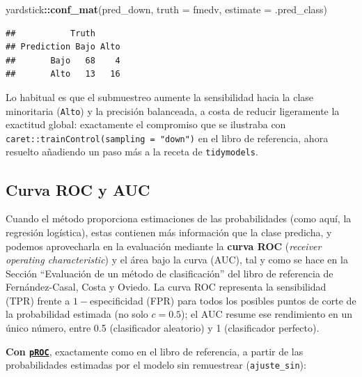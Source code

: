 \documentclass[
]{book}
\newenvironment{Shaded}{\begin{snugshade}}{\end{snugshade}}
\newcommand{\AttributeTok}[1]{\textcolor[rgb]{0.13,0.29,0.53}{#1}}
\newcommand{\FunctionTok}[1]{\textcolor[rgb]{0.13,0.29,0.53}{\textbf{#1}}}
\newcommand{\NormalTok}[1]{#1}
\newcommand{\OtherTok}[1]{\textcolor[rgb]{0.56,0.35,0.01}{#1}}
\newcommand{\SpecialCharTok}[1]{\textcolor[rgb]{0.81,0.36,0.00}{\textbf{#1}}}
\theoremstyle{break}
\theoremstyle{nonumberplain}
\begin{document}
\begin{Shaded}
\begin{Highlighting}[]
\NormalTok{yardstick}\SpecialCharTok{::}\FunctionTok{conf\_mat}\NormalTok{(pred\_down, }\AttributeTok{truth =}\NormalTok{ fmedv, }\AttributeTok{estimate =}\NormalTok{ .pred\_class)}
\end{Highlighting}
\end{Shaded}

\begin{verbatim}
##           Truth
## Prediction Bajo Alto
##       Bajo   68    4
##       Alto   13   16
\end{verbatim}

Lo habitual es que el submuestreo aumente la sensibilidad hacia la clase minoritaria (\texttt{Alto}) y la precisión balanceada, a costa de reducir ligeramente la exactitud global: exactamente el compromiso que se ilustraba con \texttt{caret::trainControl(sampling\ =\ "down")} en el libro de referencia, ahora resuelto añadiendo un paso más a la receta de \texttt{tidymodels}.

\subsection{Curva ROC y AUC}\label{roc-auc}

Cuando el método proporciona estimaciones de las probabilidades (como aquí, la regresión logística), estas contienen más información que la clase predicha, y podemos aprovecharla en la evaluación mediante la \textbf{curva ROC} (\emph{receiver operating characteristic}) y el área bajo la curva (AUC), tal y como se hace en la Sección ``Evaluación de un método de clasificación'' del libro de referencia de Fernández-Casal, Costa y Oviedo. La curva ROC representa la sensibilidad (TPR) frente a \(1-\)especificidad (FPR) para todos los posibles puntos de corte de la probabilidad estimada (no solo \(c=0.5\)); el AUC resume ese rendimiento en un único número, entre 0.5 (clasificador aleatorio) y 1 (clasificador perfecto).

\textbf{Con \href{https://cran.r-project.org/package=pROC}{\texttt{pROC}}}, exactamente como en el libro de referencia, a partir de las probabilidades estimadas por el modelo sin remuestrear (\texttt{ajuste\_sin}):

\begin{Shaded}
\end{Shaded}
\end{document}
